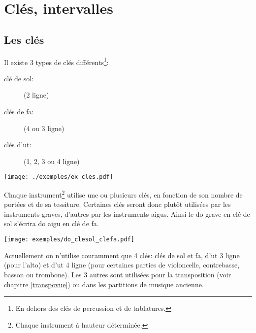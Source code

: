 \documentclass[11pt,a4paper]{scrreprt}
\begin{document}
\newpage
{}
\fancyfoot[CO]{\thepage}%
\tableofcontents
\cleardoublepage
\clearpage
{}
\fancyfoot[CO]{\thepage}%
\chapter{Clés, intervalles}
\section{Les clés}
Il existe 3 types de clés différents\footnote{En dehors des clés de percussion et de tablatures.}:
\begin{description}
\item [clé de sol:] (2\ieme{} ligne)
\item [clés de fa:] (4\ieme{} ou 3\ieme{} ligne)
\item  [clés d'ut:] (1\iere, 2\ieme, 3\ieme{} ou 4\ieme{} ligne)
\end{description}
\begin{center}
\texttt{[image: ./exemples/ex\_cles.pdf]}
\end{center}

Chaque instrument\footnote{Chaque instrument à hauteur déterminée.} utilise une ou plusieurs clés, en fonction de son nombre de portées et de sa tessiture. Certaines clés seront donc plutôt utilisées par les instruments graves, d'autres par les instruments aigus. Ainsi le do grave en clé de sol s'écrira do aigu en clé de fa.

\centerline{\texttt{[image: exemples/do\_clesol\_clefa.pdf]}}

Actuellement on n'utilise couramment que 4 clés: clés de sol et fa, d'ut 3\ieme{} ligne (pour l'alto) et d'ut 4\ieme{} ligne (pour certaines parties de violoncelle, contrebasse, basson ou trombone). Les 3 autres sont utilisées pour la transposition (voir chapitre \ref{transpovue}) ou dans les partitions de musique ancienne.
\end{document}
